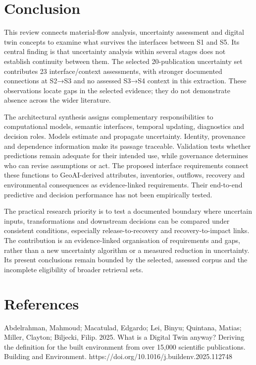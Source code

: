 \section{Conclusion}
This review connects material-flow analysis, uncertainty assessment and digital twin concepts to examine what survives the interfaces between S1 and S5. Its central finding is that uncertainty analysis within several stages does not establish continuity between them. The selected 20-publication uncertainty set contributes 23 interface/context assessments, with stronger documented connections at S2→S3 and no assessed S3→S4 context in this extraction. These observations locate gaps in the selected evidence; they do not demonstrate absence across the wider literature.

The architectural synthesis assigns complementary responsibilities to computational models, semantic interfaces, temporal updating, diagnostics and decision roles. Models estimate and propagate uncertainty. Identity, provenance and dependence information make its passage traceable. Validation tests whether predictions remain adequate for their intended use, while governance determines who can revise assumptions or act. The proposed interface requirements connect these functions to GeoAI-derived attributes, inventories, outflows, recovery and environmental consequences as evidence-linked requirements. Their end-to-end predictive and decision performance has not been empirically tested.

The practical research priority is to test a documented boundary where uncertain inputs, transformations and downstream decisions can be compared under consistent conditions, especially release-to-recovery and recovery-to-impact links. The contribution is an evidence-linked organisation of requirements and gaps, rather than a new uncertainty algorithm or a measured reduction in uncertainty. Its present conclusions remain bounded by the selected, assessed corpus and the incomplete eligibility of broader retrieval sets.


\section*{References}
Abdelrahman, Mahmoud; Macatulad, Edgardo; Lei, Binyu; Quintana, Matias; Miller, Clayton; Biljecki, Filip. 2025. What is a Digital Twin anyway? Deriving the definition for the built environment from over 15,000 scientific publications. Building and Environment. https://doi.org/10.1016/j.buildenv.2025.112748

